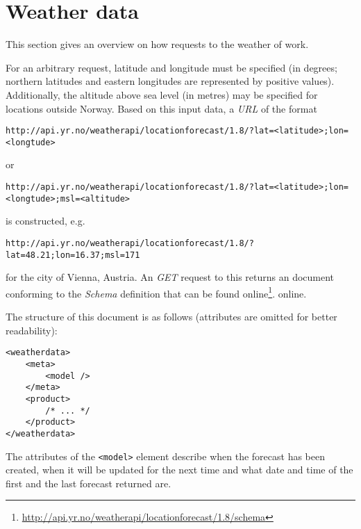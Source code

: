 \section{Weather data}
\label{sec:weather_data_yr_no}

This section gives an overview on how requests to the weather  of \yrno work.

For an arbitrary request, latitude and longitude must be specified (in degrees; northern latitudes and eastern longitudes are represented by positive values). Additionally, the altitude above sea level (in metres) may be specified for locations outside Norway. Based on this input data, a \emph{URL} of the format

\begin{lstlisting}
http://api.yr.no/weatherapi/locationforecast/1.8/?lat=<latitude>;lon=<longtude>
\end{lstlisting}

or

\begin{lstlisting}
http://api.yr.no/weatherapi/locationforecast/1.8/?lat=<latitude>;lon=<longtude>;msl=<altitude>
\end{lstlisting}

is constructed, e.g.

\begin{lstlisting}
http://api.yr.no/weatherapi/locationforecast/1.8/?lat=48.21;lon=16.37;msl=171
\end{lstlisting}

for the city of Vienna, Austria. An  \emph{GET} request to this  returns an  document conforming to the  \emph{Schema}\cite{xml-schema} definition that can be found online\footnote{\href{http://api.yr.no/weatherapi/locationforecast/1.8/schema}{http://api.yr.no/weatherapi/locationforecast/1.8/schema}}.
online.

The structure of this  document is as follows (attributes are omitted for better readability):

\begin{lstlisting}
<weatherdata>
	<meta>
		<model />
	</meta>
	<product>
		/* ... */
	</product>
</weatherdata>
\end{lstlisting}

The attributes of the \texttt{<model>} element describe when the forecast has been created, when it will be updated for the next time and what date and time of the first and the last forecast returned are.


